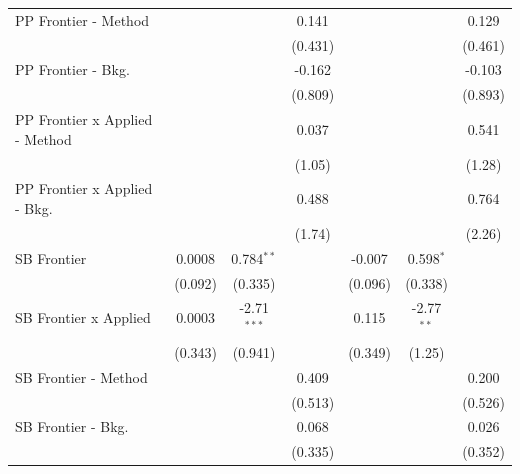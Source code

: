 \begin{tabular}{lcccccc}
   PP Frontier - Method           &               &               & 0.141         &               &              & 0.129\\   
                                  &               &               & (0.431)       &               &              & (0.461)\\   
   PP Frontier - Bkg.             &               &               & -0.162        &               &              & -0.103\\   
                                  &               &               & (0.809)       &               &              & (0.893)\\   
   PP Frontier x Applied - Method &               &               & 0.037         &               &              & 0.541\\   
                                  &               &               & (1.05)        &               &              & (1.28)\\   
   PP Frontier x Applied - Bkg.   &               &               & 0.488         &               &              & 0.764\\   
                                  &               &               & (1.74)        &               &              & (2.26)\\   
   SB Frontier                    & 0.0008        & 0.784$^{**}$  &               & -0.007        & 0.598$^{*}$  &   \\   
                                  & (0.092)       & (0.335)       &               & (0.096)       & (0.338)      &   \\   
   SB Frontier x Applied          & 0.0003        & -2.71$^{***}$ &               & 0.115         & -2.77$^{**}$ &   \\   
                                  & (0.343)       & (0.941)       &               & (0.349)       & (1.25)       &   \\   
   SB Frontier - Method           &               &               & 0.409         &               &              & 0.200\\   
                                  &               &               & (0.513)       &               &              & (0.526)\\   
   SB Frontier - Bkg.             &               &               & 0.068         &               &              & 0.026\\   
                                  &               &               & (0.335)       &               &              & (0.352)\\   

\end{tabular}
